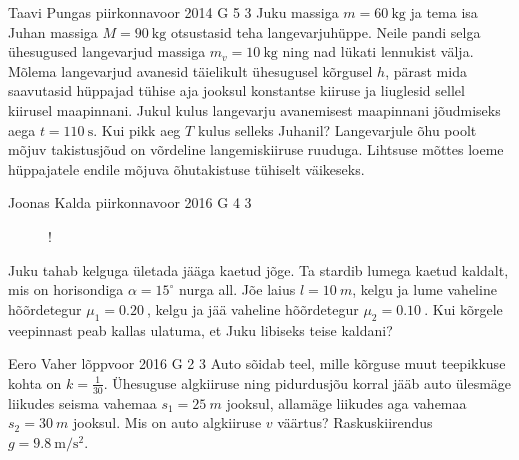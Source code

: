 \documentclass[11pt, twoside]{article}
\begin{document}
{%
{Taavi Pungas} %
{piirkonnavoor} %
{2014} %
{G 5} %
{3} %
{
\ifStatement
Juku massiga $m=\SI{60}{\kg}$ ja tema isa Juhan massiga $M=\SI{90}{\kg}$ otsustasid teha langevarjuhüppe. Neile pandi selga ühesugused langevarjud massiga $m_v=\SI{10}{\kg}$ ning nad lükati lennukist välja. Mõlema langevarjud avanesid täielikult ühesugusel kõrgusel $h$, pärast mida saavutasid hüppajad tühise aja jooksul konstantse kiiruse ja liuglesid sellel kiirusel maapinnani. Jukul kulus langevarju avanemisest maapinnani jõudmiseks aega $t=\SI{110}{\s}$. Kui pikk aeg $T$ kulus selleks Juhanil? Langevarjule õhu poolt mõjuv takistusjõud on võrdeline langemiskiiruse ruuduga. Lihtsuse mõttes loeme hüppajatele endile mõjuva õhutakistuse tühiselt väikeseks.
\fi
}

{Joonas Kalda} %
{piirkonnavoor} %
{2016} %
{G 4} %
{3} %
{
\ifStatement
\begin{figure}
	\vspace{-12pt}
	\begin{resizebox}{\linewidth}{!}{
	}
	\end{resizebox}
\end{figure}

Juku tahab kelguga ületada jääga kaetud jõge. Ta stardib lumega kaetud kaldalt, mis on horisondiga $\alpha = 15^{\circ}$ nurga all. Jõe laius $l = \SI{10}{m}$, kelgu ja lume vaheline hõõrdetegur $\mu_1 = \SI{0.20}{}$, kelgu ja jää vaheline hõõrdetegur $\mu_2 = \SI{0.10}{}$. Kui kõrgele veepinnast peab kallas ulatuma, et Juku libiseks teise kaldani?
\fi
}

{Eero Vaher} %
{lõppvoor} %
{2016} %
{G 2} %
{3} %
{
\ifStatement
Auto sõidab teel, mille kõrguse muut teepikkuse kohta on $k=\frac{1}{30}$. Ühesuguse algkiiruse ning pidurdusjõu korral jääb auto ülesmäge liikudes seisma vahemaa $s_1=\SI{25}{m}$ jooksul, allamäge liikudes aga vahemaa $s_2=\SI{30}{m}$ jooksul. Mis on auto algkiiruse $v$ väärtus? Raskuskiirendus $g=\SI{9.8}{\meter\per\second\squared}$.
\fi
}

}
\end{document}
